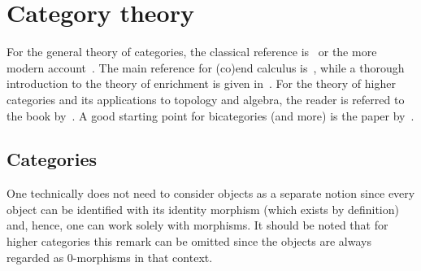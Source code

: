 \chapter{Category theory}\label{chapter:cat}

    For the general theory of categories, the classical reference is~\citet{mac_lane_categories_2013} or the more modern account~\citet{riehl_category_2017}. The main reference for (co)end calculus is~\citet{loregian_coend_2021}, while a thorough introduction to the theory of enrichment is given in~\citet{kelly_basic_1982}. For the theory of higher categories and its applications to topology and algebra, the reader is referred to the book by~\citet{baez_towards_2009}. A good starting point for bicategories (and more) is the paper by~\citet{leinster_basic_1998}.

\section{Categories}

    \begin{remark}
        One technically does not need to consider objects as a separate notion since every object can be identified with its identity morphism (which exists by definition) and, hence, one can work solely with morphisms. It should be noted that for higher categories this remark can be omitted since the objects are always regarded as 0-morphisms in that context.
    \end{remark}

